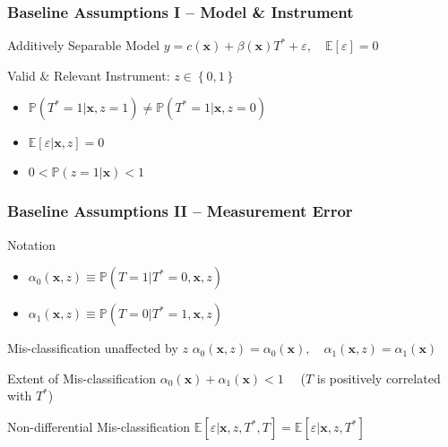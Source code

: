 \documentclass[handout]{beamer}
\begin{document}
\begin{frame}
  \frametitle{Baseline Assumptions I -- Model \& Instrument}

  \begin{block}{Additively Separable Model}
    $y = c(\mathbf{x}) + \beta(\mathbf{x}) T^* + \varepsilon, \quad \mathbb{E}[ \varepsilon] = 0$ 
  \end{block}

  \begin{block}{Valid \& Relevant Instrument: $z \in \left\{ 0,1 \right\}$}
    \begin{itemize}
      \item $\mathbb{P}(T^*=1|\mathbf{x},z=1) \neq \mathbb{P}(T^*=1|\mathbf{x},z=0)$
      \item $\mathbb{E}[\varepsilon|\mathbf{x},z] = 0$
      \item $0 < \mathbb{P}(z=1|\mathbf{x}) < 1$
    \end{itemize}
  \end{block}

\end{frame}
\begin{frame}
  \frametitle{Baseline Assumptions II -- Measurement Error}


  \begin{alertblock}{Notation}
    \begin{itemize}
      \item $\alpha_0(\mathbf{x},z) \equiv \mathbb{P}\left(T=1|T^*=0,\mathbf{x},z  \right)$
  \item $\alpha_1(\mathbf{x},z) \equiv \mathbb{P}\left(T=0|T^*=1,\mathbf{x},z  \right)$
    \end{itemize}
  \end{alertblock}

  \begin{block}{Mis-classification unaffected by $z$}
    $\alpha_0(\mathbf{x},z) = \alpha_0(\mathbf{x}), \quad   \alpha_1(\mathbf{x},z) = \alpha_1(\mathbf{x})$
  \end{block}

  \begin{block}{Extent of Mis-classification}
      $\alpha_0(\mathbf{x}) + \alpha_1(\mathbf{x}) < 1 \quad$ ($T$ is positively correlated with $T^*$)
  \end{block}

  \begin{block}{Non-differential Mis-classification}
     $\mathbb{E}[\varepsilon|\mathbf{x},z,T^*,T] = \mathbb{E}[\varepsilon|\mathbf{x},z, T^*]$
  \end{block}



\end{frame}
\end{document}
